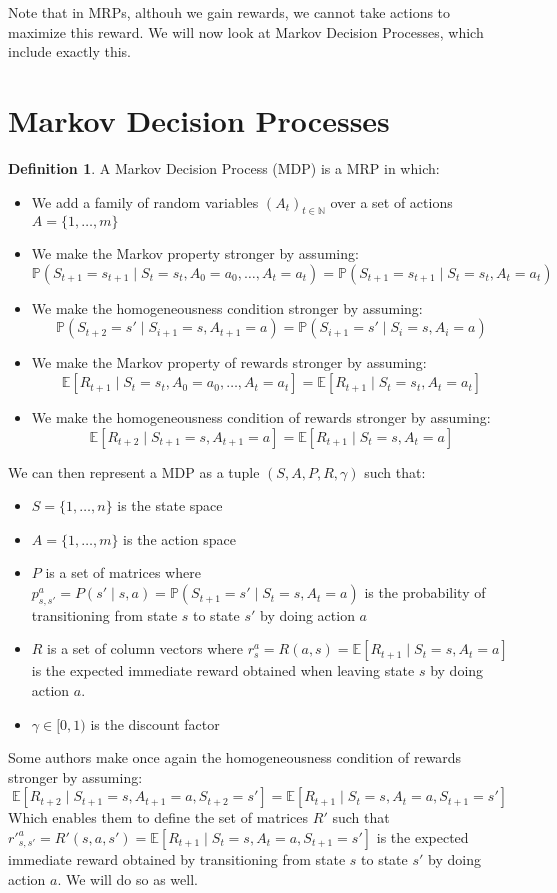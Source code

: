 \documentclass{article}
\theoremstyle{definition}
\newtheorem{definition}{Definition}[section]
\theoremstyle{remark}
\theoremstyle{example}
\begin{document}
Note that in MRPs, althouh we gain rewards, we cannot take actions to maximize this reward. We will now look at Markov Decision Processes, which include exactly this.

\section{Markov Decision Processes}

\begin{definition}
		A Markov Decision Process (MDP) is a MRP in which:
		\begin{itemize}
				\item We add a family of random variables $(A_t)_{t \in \mathbb{N}}$ over a set of actions $A = \{1, \dots, m\}$
				\item We make the Markov property stronger by assuming:
						$$\mathbb{P}(S_{t+1} = s_{t+1} \mid S_t = s_t, A_0 = a_0, \dots, A_t = a_t) = \mathbb{P}(S_{t+1} = s_{t+1} \mid S_t = s_t, A_t = a_t)$$
				\item We make the homogeneousness condition stronger by assuming:
						$$\mathbb{P}(S_{t+2} = s' \mid S_{i+1} = s, A_{t+1} = a) = \mathbb{P}(S_{i+1} = s' \mid S_i = s, A_i = a)$$
				\item We make the Markov property of rewards stronger by assuming:
						$$\mathbb{E}[R_{t+1} \mid S_t = s_t, A_0 = a_0, \dots, A_t = a_t] = \mathbb{E}[R_{t+1} \mid S_t = s_t, A_t = a_t]$$
				\item We make the homogeneousness condition of rewards stronger by assuming:
						$$\mathbb{E}[R_{t+2} \mid S_{t+1} = s, A_{t+1} = a] = \mathbb{E}[R_{t+1} \mid S_t = s, A_t = a]$$
		\end{itemize}
		We can then represent a MDP as a tuple $(S, A, P, R, \gamma)$ such that:
		\begin{itemize}
				\item $S = \{1, \dots, n\}$ is the state space
				\item $A = \{1, \dots, m\}$ is the action space
				\item $P$ is a set of matrices where $p^a_{s,s'} = P(s' \mid s, a) = \mathbb{P}(S_{t+1} = s' \mid S_t = s, A_t = a)$ is the probability of transitioning from state $s$ to state $s'$ by doing action $a$
				\item $R$ is a set of column vectors where $r^a_s = R(a, s) = \mathbb{E}[R_{t+1} \mid S_t = s, A_t = a]$ is the expected immediate reward obtained when leaving state $s$ by doing action $a$.
				\item $\gamma \in [0, 1)$ is the discount factor
		\end{itemize}
		Some authors make once again the homogeneousness condition of rewards stronger by assuming:
				$$\mathbb{E}[R_{t+2} \mid S_{t+1} = s, A_{t+1} = a, S_{t+2} = s'] = \mathbb{E}[R_{t+1} \mid S_t = s, A_t = a, S_{t+1} = s']$$
				Which enables them to define the set of matrices $R'$ such that $r'^a_{s,s'} = R'(s, a, s') = \mathbb{E}[R_{t+1} \mid S_t = s, A_t = a, S_{t+1} = s']$ is the expected immediate reward obtained by transitioning from state $s$ to state $s'$ by doing action $a$. We will do so as well.
\end{definition}
\end{document}
